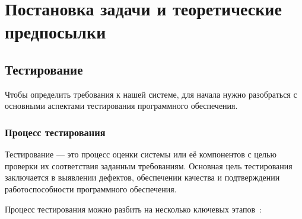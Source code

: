 \section{Постановка задачи и теоретические предпосылки}

\subsection{Тестирование}

Чтобы определить требования к нашей системе, для начала нужно разобраться с основными аспектами тестирования программного обеспечения.

\subsubsection{Процесс тестирования}

Тестирование — это процесс оценки системы или её компонентов с целью проверки их соответствия заданным требованиям. Основная цель тестирования заключается в выявлении дефектов, обеспечении качества и подтверждении работоспособности программного обеспечения.

Процесс тестирования можно разбить на несколько ключевых этапов~\cite{rex-black}:

